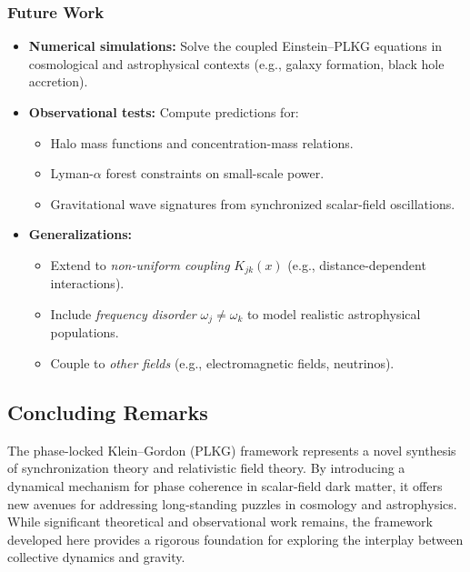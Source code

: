 \subsubsection{Future Work}
\begin{itemize}
    \item \textbf{Numerical simulations:} Solve the coupled Einstein--PLKG equations in cosmological and astrophysical contexts (e.g., galaxy formation, black hole accretion).
    \item \textbf{Observational tests:} Compute predictions for:
    \begin{itemize}
        \item Halo mass functions and concentration-mass relations.
        \item Lyman-$\alpha$ forest constraints on small-scale power.
        \item Gravitational wave signatures from synchronized scalar-field oscillations.
    \end{itemize}
    \item \textbf{Generalizations:}
    \begin{itemize}
        \item Extend to \emph{non-uniform coupling} $K_{jk}(x)$ (e.g., distance-dependent interactions).
        \item Include \emph{frequency disorder} $\omega_j \neq \omega_k$ to model realistic astrophysical populations.
        \item Couple to \emph{other fields} (e.g., electromagnetic fields, neutrinos).
    \end{itemize}
\end{itemize}

\subsection{Concluding Remarks}
\label{subsec:concluding-remarks}
The phase-locked Klein--Gordon (PLKG) framework represents a novel synthesis of synchronization theory and relativistic field theory. By introducing a dynamical mechanism for phase coherence in scalar-field dark matter, it offers new avenues for addressing long-standing puzzles in cosmology and astrophysics. While significant theoretical and observational work remains, the framework developed here provides a rigorous foundation for exploring the interplay between collective dynamics and gravity.

